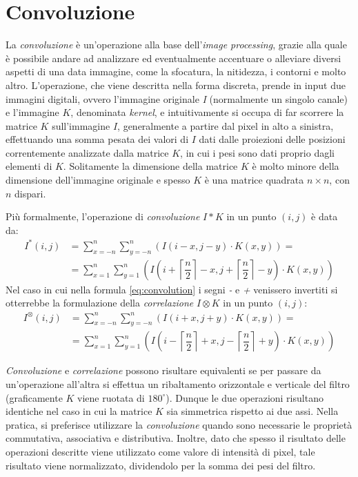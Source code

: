 \section{Convoluzione}
\label{sec:math-convolution}
La \textit{convoluzione} \`e un'operazione alla base dell'\textit{image processing}, grazie alla quale \`e possibile andare ad analizzare ed eventualmente accentuare o alleviare diversi aspetti di una data immagine, come la sfocatura, la nitidezza, i contorni e molto altro. L'operazione, che viene descritta nella forma discreta, prende in input due immagini digitali, ovvero l'immagine originale \textit{I} (normalmente un singolo canale) e l'immagine $K$, denominata \textit{kernel}, e intuitivamente si occupa di far scorrere la matrice $K$ sull'immagine $I$, generalmente a partire dal pixel in alto a sinistra, effettuando una somma pesata dei valori di $I$ dati dalle proiezioni delle posizioni correntemente analizzate dalla matrice $K$, in cui i pesi sono dati proprio dagli elementi di $K$. Solitamente la dimensione della matrice $K$ \`e molto minore della dimensione dell'immagine originale e spesso $K$ \`e una matrice quadrata $n\times n$, con $n$ dispari.\par
Pi\`u formalmente, l'operazione di \textit{convoluzione} $I * K$ in un punto $(i,j)$ \`e data da:
\begin{equation}
	\label{eq:convolution}
	\begin{split}
		I^{*}(i, j) & = \sum_{x = -n}^{n}\sum_{y = -n}^{n}(I(i-x, j-y)\cdot K(x,y))=\\
		& = \sum_{x = 1}^{n}\sum_{y = 1}^{n}(I(i + \left\lceil{\dfrac{n}{2}}\right\rceil - x, j + \left\lceil{\dfrac{n}{2}}\right\rceil - y)\cdot K(x,y))
	\end{split}
\end{equation}
Nel caso in cui nella formula \ref{eq:convolution} i segni \textit{-} e \textit{+} venissero invertiti si otterrebbe la formulazione della \textit{correlazione} $I \otimes K$ in un punto $(i,j)$:
\begin{equation}
	\label{eq:correlation}
	\begin{split}
		I^{\otimes}(i, j) & = \sum_{x = -n}^{n}\sum_{y = -n}^{n}(I(i+x, j+y)\cdot K(x,y))=\\
		& = \sum_{x = 1}^{n}\sum_{y = 1}^{n}(I(i - \left\lceil{\dfrac{n}{2}}\right\rceil + x, j - \left\lceil{\dfrac{n}{2}}\right\rceil + y)\cdot K(x,y))
	\end{split}
\end{equation}\par
\textit{Convoluzione} e \textit{correlazione} possono risultare equivalenti se per passare da un'operazione all'altra si effettua un ribaltamento orizzontale e verticale del filtro (graficamente $K$ viene ruotata di $180^{\circ}$). Dunque le due operazioni risultano identiche nel caso in cui la matrice $K$ sia simmetrica rispetto ai due assi. Nella pratica, si preferisce utilizzare la \textit{convoluzione} quando sono necessarie le propriet\`a commutativa, associativa e distributiva. Inoltre, dato che spesso il risultato delle operazioni descritte viene utilizzato come valore di intensit\`a di pixel, tale risultato viene normalizzato, dividendolo per la somma dei pesi del filtro.\par
